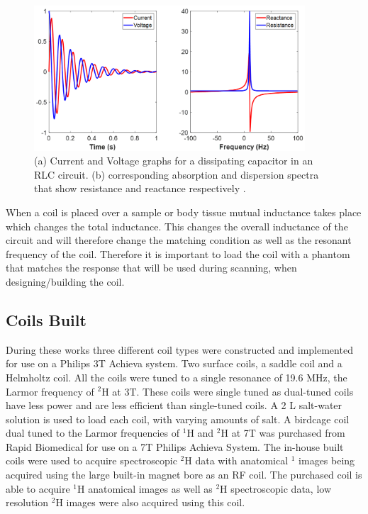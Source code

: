\documentclass[class=article, crop=false]{standalone}
\begin{document}
\begin{figure}
    \centering
    \includegraphics[width=0.9\textwidth]{Figures/Theory/VI.png}
    \caption{(a) Current and Voltage graphs for a dissipating capacitor in an RLC circuit. (b) corresponding absorption and dispersion spectra that show resistance and reactance respectively .}
    \label{fig:theory:VI}
\end{figure}

When a coil is placed over a sample or body tissue mutual inductance takes place which changes the total inductance. This changes the overall inductance of the circuit and will therefore change the matching condition as well as the resonant frequency of the coil. Therefore it is important to load the coil with a phantom that matches the response that will be used during scanning, when designing/building the coil. 

\subsection{Coils Built}

During these works three different coil types were constructed and implemented for use on a Philips 3T Achieva system. Two surface coils, a saddle coil and a Helmholtz coil. All the coils were tuned to a single resonance of 19.6 MHz, the Larmor frequency of $^2$H at 3T. These coils were single tuned as dual-tuned coils have less power and are less efficient than single-tuned coils. A 2 L salt-water solution is used to load each coil, with varying amounts of salt. A birdcage coil dual tuned to the Larmor frequencies of $^1$H and $^2$H at 7T was purchased from Rapid Biomedical for use on a 7T Philips Achieva System. The in-house built coils were used to acquire spectroscopic $^2$H data with anatomical $^1$ images being acquired using the large built-in magnet bore as an RF coil. The purchased coil is able to acquire $^1$H anatomical images as well as $^2$H spectroscopic data, low resolution $^2$H images were also acquired using this coil.
\end{document}
